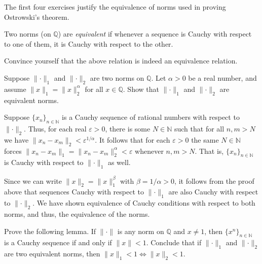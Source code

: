 \documentclass[12 pt, letterpaper]{hmcpset}
\begin{document}
The first four exercises justify the equivalence of norms used in proving Ostrowski's theorem.

\begin{definition}
	Two norms (on $\mathbb{Q}$) are \emph{equivalent} if whenever a sequence is Cauchy with respect to one of them, it is Cauchy with respect to the other.
\end{definition}

\begin{problem}
	Convince yourself that the above relation is indeed an equivalence relation.
\end{problem}

\pagebreak

\begin{problem}[(2)]
	Suppose $\lVert \cdot \rVert_{1}$ and $\lVert \cdot \rVert_{2}$ are two norms on $\mathbb{Q}$. Let $\alpha > 0$ be a real number, and assume $\lVert x \rVert_{1} = \lVert x \rVert_{2}^{\alpha}$ for all $x \in \mathbb{Q}$. Show that $\lVert \cdot \rVert_{1}$ and $\lVert \cdot \rVert_{2}$ are equivalent norms.
\end{problem}

\begin{solution}
	Suppose $\{ x_{n} \}_{n \in \mathbb{N}}$ is a Cauchy sequence of rational numbers with respect to $\lVert \cdot \rVert_{2}$. Thus, for each real $\varepsilon > 0$, there is some $N \in \mathbb{N}$ such that for all $n, m > N$ we have $\lVert x_{n} - x_{m} \rVert_{2} < \varepsilon^{1 / \alpha}$. It follows that for each $\varepsilon > 0$ the same $N \in \mathbb{N}$ forces $\lVert x_{n} - x_{m} \rVert_{1} = \lVert x_{n} - x_{m} \rVert_{2}^{\alpha} < \varepsilon$ whenever $n, m > N$. That is, $\{ x_{n} \}_{n \in \mathbb{N}}$ is Cauchy with respect to $\lVert \cdot \rVert_{1}$ as well.

	Since we can write $\lVert x \rVert_{2} = \lVert x \rVert_{1}^{\beta}$ with $\beta = 1 / \alpha > 0$, it follows from the proof above that sequences Cauchy with respect to $\lVert \cdot \rVert_{1}$ are also Cauchy with respect to $\lVert \cdot \rVert_{2}$. We have shown equivalence of Cauchy conditions with respect to both norms, and thus, the equivalence of the norms.
\end{solution}

\pagebreak

\begin{problem}[(3)]
	Prove the following lemma. If $\lVert \cdot \rVert$ is any norm on $\mathbb{Q}$ and $x \neq 1$, then $\{ x^{n} \}_{n \in \mathbb{N}}$ is a Cauchy sequence if and only if $\lVert x \rVert < 1$. Conclude that if $\lVert \cdot \rVert_{1}$ and $\lVert \cdot \rVert_{2}$ are two equivalent norms, then $\lVert x \rVert_{1} < 1 \iff \lVert x \rVert_{2} < 1$.
\end{problem}
\end{document}
